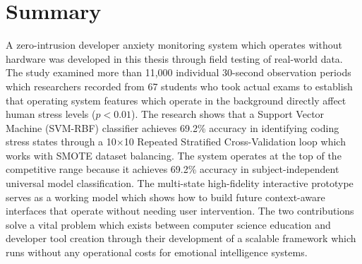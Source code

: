 \section{Summary}
A zero-intrusion developer anxiety monitoring system which operates without hardware was developed in this thesis through field testing of real-world data. The study examined more than 11,000 individual 30-second observation periods which researchers recorded from 67 students who took actual exams to establish that operating system features which operate in the background directly affect human stress levels ($p < 0.01$). The research shows that a Support Vector Machine (SVM-RBF) classifier achieves 69.2\% accuracy in identifying coding stress states through a 10×10 Repeated Stratified Cross-Validation loop which works with SMOTE dataset balancing. The system operates at the top of the competitive range because it achieves 69.2\% accuracy in subject-independent universal model classification. The multi-state high-fidelity interactive prototype serves as a working model which shows how to build future context-aware interfaces that operate without needing user intervention. The two contributions solve a vital problem which exists between computer science education and developer tool creation through their development of a scalable framework which runs without any operational costs for emotional intelligence systems.